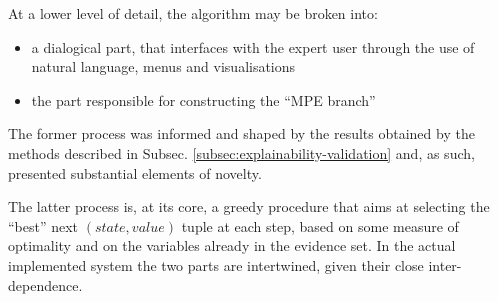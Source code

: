 At a lower level of detail, the algorithm may be broken into:
\begin{itemize}
	\item a dialogical part, that interfaces with the expert user through the use of natural language, menus and visualisations
	\item the part responsible for constructing the \enquote{MPE branch}
\end{itemize}
The former process was informed and shaped by the results obtained by the methods described in Subsec. \ref{subsec:explainability-validation} and, as such, presented substantial elements of novelty.

The latter process is, at its core, a greedy procedure that aims at selecting the \enquote{best} next $(state, value)$ tuple at each step, based on some measure of optimality and on the variables already in the evidence set.
In the actual implemented system the two parts are intertwined, given their close inter-dependence.

